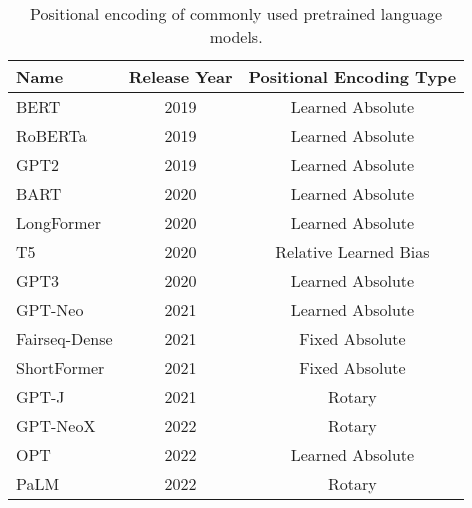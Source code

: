 \begin{table*}
\centering
\footnotesize
\begin{tabular}{
    l
    c
    c
}
\toprule 
Name       &  Release Year  & Positional Encoding Type  \\
\midrule
BERT \citep{Devlin2019:BERT} & 2019 & Learned Absolute \\
RoBERTa \citep{Liu2019:RoBERTa} & 2019 & Learned Absolute \\
GPT2 \citep{Radford2019:GPT2} & 2019 & Learned Absolute \\
BART \citep{Lewis2020:BART} & 2020 & Learned Absolute \\
LongFormer \citep{longformer} & 2020 & Learned Absolute \\
T5 \citep{Raffel2020:T5} & 2020 & Relative Learned Bias \\
GPT3 \citep{Brown2020:GPT3} & 2020 & Learned Absolute \\
GPT-Neo \citep{gpt-neo} & 2021 & Learned Absolute \\
Fairseq-Dense \citep{fairseq} & 2021 & Fixed Absolute  \\
ShortFormer \citep{shortformer} & 2021 & Fixed Absolute \\
GPT-J \citep{mesh-transformer-jax} & 2021 & Rotary \\
GPT-NeoX \citep{Black2022:GPTNeoX} & 2022 & Rotary \\
OPT \citep{Zhang2022:OPT} & 2022 & Learned Absolute \\
PaLM \citep{palm} & 2022 & Rotary \\

\bottomrule
\end{tabular}
\caption{Positional encoding of commonly used pretrained language models.}
\label{tab:models_pe}
\end{table*}
